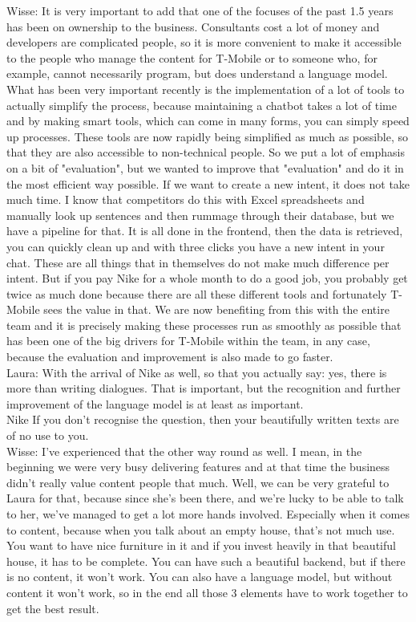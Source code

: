 \begin{appendices}
	Wisse: It is very important to add that one of the focuses of the past 1.5 years has been on ownership to the business. Consultants cost a lot of money and developers are complicated people, so it is more convenient to make it accessible to the people who manage the content for T-Mobile or to someone who, for example, cannot necessarily program, but does understand a language model. What has been very important recently is the implementation of a lot of tools to actually simplify the process, because maintaining a chatbot takes a lot of time and by making smart tools, which can come in many forms, you can simply speed up processes. These tools are now rapidly being simplified as much as possible, so that they are also accessible to non-technical people. So we put a lot of emphasis on a bit of "evaluation", but we wanted to improve that "evaluation" and do it in the most efficient way possible. If we want to create a new intent, it does not take much time. I know that competitors do this with Excel spreadsheets and manually look up sentences and then rummage through their database, but we have a pipeline for that. It is all done in the frontend, then the data is retrieved, you can quickly clean up and with three clicks you have a new intent in your chat. These are all things that in themselves do not make much difference per intent. But if you pay Nike for a whole month to do a good job, you probably get twice as much done because there are all these different tools and fortunately T-Mobile sees the value in that. We are now benefiting from this with the entire team and it is precisely making these processes run as smoothly as possible that has been one of the big drivers for T-Mobile within the team, in any case, because the evaluation and improvement is also made to go faster.\\
	\break
	Laura: With the arrival of Nike as well, so that you actually say: yes, there is more than writing dialogues. That is important, but the recognition and further improvement of the language model is at least as important.\\
	\break
	Nike If you don't recognise the question, then your beautifully written texts are of no use to you.\\
	\break
	Wisse: I've experienced that the other way round as well. I mean, in the beginning we were very busy delivering features and at that time the business didn't really value content people that much. Well, we can be very grateful to Laura for that, because since she's been there, and we're lucky to be able to talk to her, we've managed to get a lot more hands involved. Especially when it comes to content, because when you talk about an empty house, that's not much use. You want to have nice furniture in it and if you invest heavily in that beautiful house, it has to be complete. You can have such a beautiful backend, but if there is no content, it won't work. You can also have a language model, but without content it won't work, so in the end all those 3 elements have to work together to get the best result.
	

\end{appendices}
